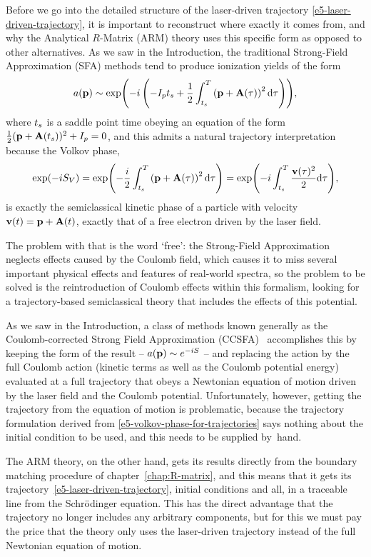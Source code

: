 Before we go into the detailed structure of the laser-driven trajectory \eqref{e5-laser-driven-trajectory}, it is important to reconstruct where exactly it comes from, and why the Analytical $R$-Matrix (ARM) theory uses this specific form as opposed to other alternatives. As we saw in the Introduction, the traditional Strong-Field Approximation (SFA) methods tend to produce ionization yields of the form
\begin{equation}
a(\vb{p})
\sim
\exp(-i\left(
 -I_{p} {t_s} + \frac{1}{2} \int_{{t_s}}^{T}\left(\vb{p}+\vb{A}(\tau)\right)^2\mathrm{d}\tau 
\right))
,
\label{e5-sfa-like-yield}
\end{equation}
where ${t_s}$ is a saddle point time obeying an equation of the form $\frac12 (\vb{p}+\vb{A}({t_s}))^2+I_p = 0$, and this admits a natural trajectory interpretation because the Volkov phase,
\begin{equation}
\exp(-iS_V)
=
\exp(- \frac{i}{2} \int_{{t_s}}^{T}\left(\vb{p}+\vb{A}(\tau)\right)^2\mathrm{d}\tau )
=
\exp(-i\int_{{t_s}}^{T}\frac{\vb{v}(\tau)^2}{2} \mathrm{d}\tau )
,
\label{e5-volkov-phase-for-trajectories}
\end{equation}
is exactly the semiclassical kinetic phase of a particle with velocity $\vb{v}(t) =\vb{p} +\vb{A}(t)$, exactly that of a free electron driven by the laser field.

The problem with that is the word `free': the Strong-Field Approximation neglects effects caused by the Coulomb field, which causes it to miss several important physical effects and features of real-world spectra, so the problem to be solved is the reintroduction of Coulomb effects within this formalism, looking for a trajectory-based semiclassical theory that includes the effects of this potential.

As we saw in the Introduction, a class of methods known generally as the Coulomb-corrected Strong Field Approximation (CCSFA)~\cite{CCSFA_initial_short, CCSFA_initial_full} accomplishes this by keeping the form of the result -- $a(\vb{p})\sim e^{-iS}$ -- and replacing the action by the full Coulomb action (kinetic terms as well as the Coulomb potential energy) evaluated at a full trajectory that obeys a Newtonian equation of motion driven by the laser field and the Coulomb potential. Unfortunately, however, getting the trajectory from the equation of motion is problematic, because the trajectory formulation derived from \eqref{e5-volkov-phase-for-trajectories} says nothing about the initial condition to be used, and this needs to be supplied by~hand.


The ARM theory, on the other hand, gets its results directly from the boundary matching procedure of chapter~\ref{chap:R-matrix}, and this means that it gets its trajectory~\eqref{e5-laser-driven-trajectory}, initial conditions and all, in a traceable line from the Schrödinger equation. This has the direct advantage that the trajectory no longer includes any arbitrary components, but for this we must pay the price that the theory only uses the laser-driven trajectory instead of the full Newtonian equation of motion. 

